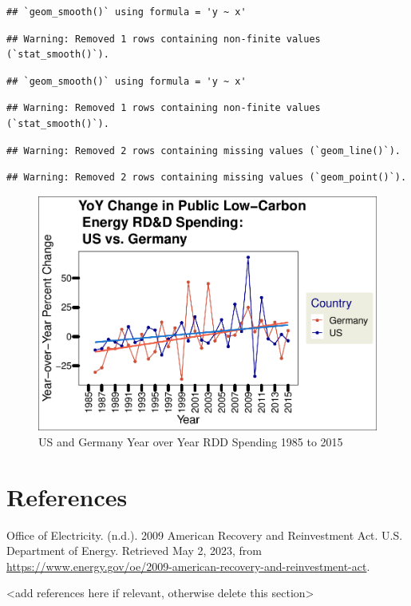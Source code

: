 \documentclass[
  12pt,
]{article}
\begin{document}
\begin{verbatim}
## `geom_smooth()` using formula = 'y ~ x'
\end{verbatim}

\begin{verbatim}
## Warning: Removed 1 rows containing non-finite values (`stat_smooth()`).
\end{verbatim}

\begin{verbatim}
## `geom_smooth()` using formula = 'y ~ x'
\end{verbatim}

\begin{verbatim}
## Warning: Removed 1 rows containing non-finite values (`stat_smooth()`).
\end{verbatim}

\begin{verbatim}
## Warning: Removed 2 rows containing missing values (`geom_line()`).
\end{verbatim}

\begin{verbatim}
## Warning: Removed 2 rows containing missing values (`geom_point()`).
\end{verbatim}

\begin{figure}
\centering
\includegraphics{Chang_Jenkins_Mullens_ENV872_Final_files/figure-latex/visualizing the US and Germany data together-1.pdf}
\caption{US and Germany Year over Year RDD Spending 1985 to 2015}
\end{figure}

\hypertarget{references}{%
\section{References}\label{references}}

Office of Electricity. (n.d.). 2009 American Recovery and Reinvestment
Act. U.S. Department of Energy. Retrieved May 2, 2023, from
\url{https://www.energy.gov/oe/2009-american-recovery-and-reinvestment-act}.

\textless add references here if relevant, otherwise delete this
section\textgreater{}
\end{document}
